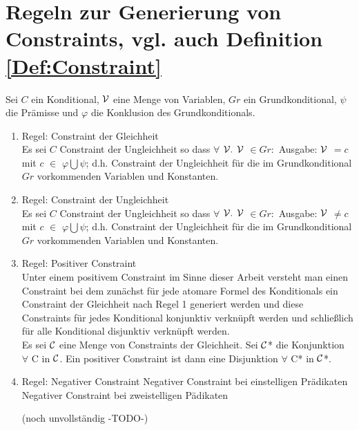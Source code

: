 \documentclass[a4paper, 11pt]{book}
\begin{document}
\section{Regeln zur Generierung von Constraints, vgl. auch Definition \ref{Def:Constraint} }\label{Reg} 
Sei $ C $ ein Konditional, $ \cal{V} $ eine Menge von Variablen, $ Gr $ ein Grundkonditional, $ \psi $ die Prämisse und $ \varphi $ die Konklusion des Grundkonditionals.
\begin{enumerate}
	\item \label{Reg1} Regel: Constraint der Gleichheit\\
	Es sei $ C $ Constraint der Ungleichheit so dass $\forall $  $\cal{V.}$  $ \cal{V}$  $ \in Gr :$ Ausgabe:  $ \cal{V}  $ $ = c $ mit $ c $  $ \in $ $ \varphi \bigcup \psi$; d.h. Constraint der Ungleichheit für die im Grundkonditional  $ Gr $ vorkommenden Variablen und Konstanten.
	
	\item \label{Reg2} Regel: Constraint der Ungleichheit\\
	Es sei $ C $ Constraint der Ungleichheit so dass $\forall $  $\cal{V.}$  $ \cal{V}$  $ \in Gr :$ Ausgabe:  $ \cal{V}  $ $ \neq c $ mit $ c $  $ \in $ $ \varphi \bigcup \psi$; d.h. Constraint der Ungleichheit für die im Grundkonditional  $ Gr $ vorkommenden Variablen und Konstanten.
	\item \label{Reg3} Regel: Positiver Constraint\\
	Unter einem positivem Constraint im Sinne dieser Arbeit versteht man einen Constraint bei dem zunächst für jede atomare Formel des Konditionals ein Constraint der Gleichheit nach Regel 1 generiert werden und diese Constraints für jedes Konditional konjunktiv verknüpft werden und schließlich für alle Konditional disjunktiv verknüpft werden.\\
	Es sei $ \cal {C} $ eine Menge von Constraints der Gleichheit. Sei $ \cal{C} $* die Konjunktion $ \forall $  C in $\cal {C}  $. Ein positiver Constraint ist dann eine Disjunktion $ \forall $ C* in $ \cal{C} $*.
	
	\item \label{Reg4} Regel: Negativer Constraint 
	\subitem Negativer Constraint bei einstelligen Prädikaten
	\subitem Negativer Constraint bei zweistelligen Pädikaten
	
	
	
	
	
	(noch unvollständig -TODO-)
\end{enumerate}
\end{document}
